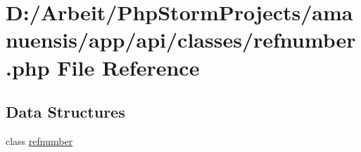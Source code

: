 \hypertarget{refnumber_8php}{}\section{D\+:/\+Arbeit/\+Php\+Storm\+Projects/amanuensis/app/api/classes/refnumber.php File Reference}
\label{refnumber_8php}
\subsection*{Data Structures}
\begin{DoxyCompactItemize}
\item 
class \hyperlink{classrefnumber}{refnumber}
\end{DoxyCompactItemize}

